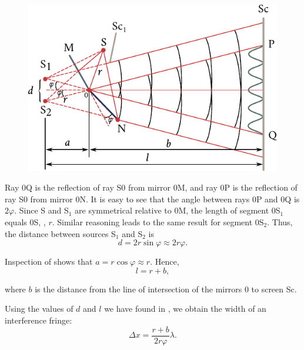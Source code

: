 \begin{figure}[t]
	\begin{center}
		\includegraphics[scale=0.98]{figures/ch_17/fig_17_8.pdf}
		\caption[]{}
		\label{fig:17_8}
	\end{center}
	\vspace{-0.9cm}
\end{figure}

Ray $0$Q is the reflection of ray S$0$ from mirror $0$M, and ray $0$P is the reflection of ray S$0$ from mirror $0$N.
It is easy to see that the angle between rays $0$P and $0$Q is $2\varphi$.
Since S and S$_1$ are symmetrical relative to $0$M, the length of segment $0$S$_1$ equals $0$S, \ie, $r$.
Similar reasoning leads to the same result for segment $0$S$_2$.
Thus, the distance between sources S$_1$ and S$_2$ is
\begin{equation*}
    d = 2r \sin\varphi \approx 2 r \varphi.
\end{equation*}

\noindent
Inspection of  shows that $a=r \cos\varphi \approx r$.
Hence,
\begin{equation*}
    l = r + b,
\end{equation*}

\noindent
where $b$ is the distance from the line of intersection of the mirrors $0$ to screen Sc.

Using the values of $d$ and $l$ we have found in , we obtain the width of an interference fringe:
\begin{equation}\label{eq:17_28}
    \Delta{x} = \frac{r + b}{2 r \varphi} \lambda.
\end{equation}

